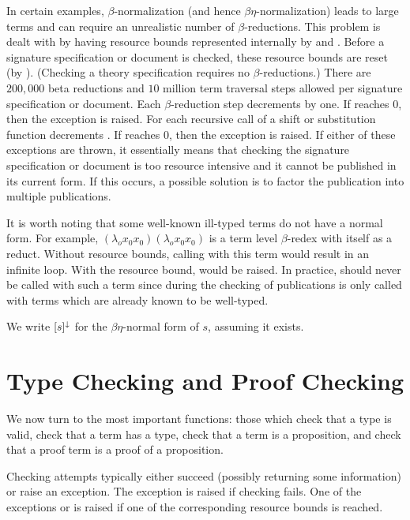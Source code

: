 In certain examples, $\beta$-normalization (and hence $\beta\eta$-normalization)
leads to large terms and can require
an unrealistic number of $\beta$-reductions.
This problem is dealt with by having resource bounds
represented internally by {}
and {}.
Before a signature specification or document is checked,
these resource bounds are reset (by {}).
(Checking a theory specification requires no $\beta$-reductions.)
There are $200,000$ beta reductions and $10$ million term traversal steps
allowed per signature specification or document.
Each $\beta$-reduction step decrements {} by one.
If {} reaches $0$, then the exception {} is raised.
For each recursive call of a shift or substitution function
decrements {}.
If {} reaches $0$, then the exception {} is raised.
If either of these exceptions are thrown, it essentially means that checking
the signature specification or document is too resource intensive and
it cannot be published in its current form.
If this occurs, a possible solution is to factor the publication into multiple publications.

It is worth noting that some well-known ill-typed terms do not have a normal form.
For example, $(\lambda_o x_0 x_0) (\lambda_o x_0 x_0)$ is a term level $\beta$-redex
with itself as a reduct. Without resource bounds, calling {}
with this term would result in an infinite loop. With the resource bound, {}
would be raised.
In practice, {} should never be called with such a term
since during the checking of publications {} is only
called with terms which are already known to be well-typed.

We write $[s]^{\downarrow}$ for the $\beta\eta$-normal form of $s$, assuming it exists.

\section{Type Checking and Proof Checking}

We now turn to the most important functions: those which check that a type
is valid, check that a term has a type, check that a term is a proposition,
and check that a proof term is a proof of a proposition.

Checking attempts typically either succeed
(possibly returning some information)
or raise an exception.
The exception {} is raised
if checking fails.
One of the exceptions {} or {} is raised
if one of the corresponding resource bounds is reached.


